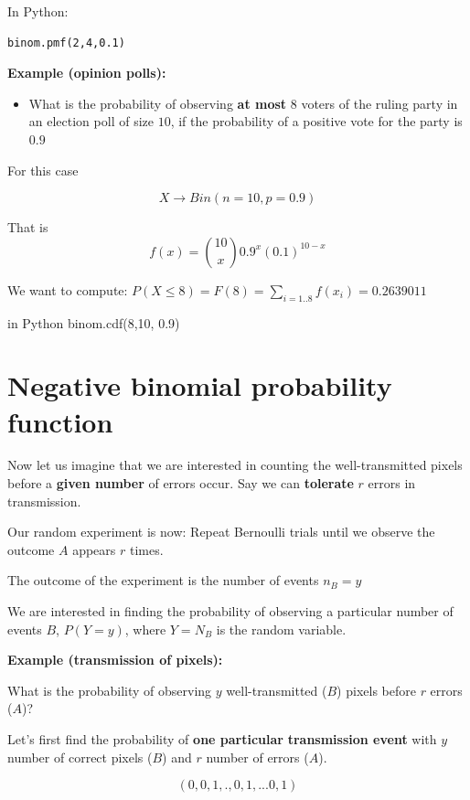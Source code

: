 \documentclass[
]{book}
\providecommand{\tightlist}{%
  \setlength{\itemsep}{0pt}\setlength{\parskip}{0pt}}
\begin{document}
In Python:

\begin{verbatim}
binom.pmf(2,4,0.1)
\end{verbatim}

\textbf{Example (opinion polls):}

\begin{itemize}
\tightlist
\item
  What is the probability of observing \textbf{at most} \(8\) voters of the ruling party in an election poll of size \(10\), if the probability of a positive vote for the party is \(0.9\)
\end{itemize}

For this case

\[X \rightarrow Bin(n=10, p=0.9)\]

That is \[f(x)=\binom {10} x 0.9^x(0.1)^{10-x}\]

We want to compute:
\(P(X\le 8)=F(8)= \sum_{i=1..8} f(x_i)=0.2639011\)

in Python binom.cdf(8,10, 0.9)

\hypertarget{negative-binomial-probability-function}{%
\section{Negative binomial probability function}\label{negative-binomial-probability-function}}

Now let us imagine that we are interested in counting the well-transmitted pixels before a \textbf{given number} of errors occur. Say we can \textbf{tolerate} \(r\) errors in transmission.

Our random experiment is now: Repeat Bernoulli trials until we observe the outcome \(A\) appears \(r\) times.

The outcome of the experiment is the number of events \(n_B=y\)

We are interested in finding the probability of observing a particular number of events \(B\), \(P(Y=y)\), where \(Y=N_B\) is the random variable.

\textbf{Example (transmission of pixels):}

What is the probability of observing \(y\) well-transmitted (\(B\)) pixels before \(r\) errors (\(A\))?

Let's first find the probability of \textbf{one particular} \textbf{transmission event} with \(y\) number of correct pixels (\(B\)) and \(r\) number of errors (\(A\)).

\[(0,0,1,., 0,1,...0,1)\]
\end{document}
